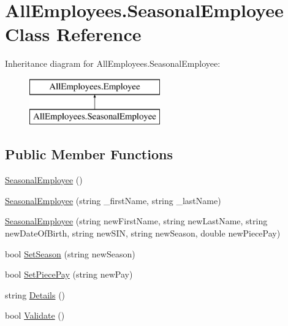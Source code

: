 \hypertarget{class_all_employees_1_1_seasonal_employee}{}\section{All\+Employees.\+Seasonal\+Employee Class Reference}
\label{class_all_employees_1_1_seasonal_employee}
Inheritance diagram for All\+Employees.\+Seasonal\+Employee\+:\begin{figure}[H]
\begin{center}
\leavevmode
\includegraphics[height=2.000000cm]{class_all_employees_1_1_seasonal_employee}
\end{center}
\end{figure}
\subsection*{Public Member Functions}
\begin{DoxyCompactItemize}
\item 
\hyperlink{class_all_employees_1_1_seasonal_employee_a2206a19da96d42cbd56e7fb5d073c7d4}{Seasonal\+Employee} ()
\item 
\hyperlink{class_all_employees_1_1_seasonal_employee_aa0c1a5afb55e8d691eab0936d5d30786}{Seasonal\+Employee} (string \+\_\+first\+Name, string \+\_\+last\+Name)
\item 
\hyperlink{class_all_employees_1_1_seasonal_employee_acbb93664ccc48e2fe8f57487424a2c53}{Seasonal\+Employee} (string new\+First\+Name, string new\+Last\+Name, string new\+Date\+Of\+Birth, string new\+S\+I\+N, string new\+Season, double new\+Piece\+Pay)
\item 
bool \hyperlink{class_all_employees_1_1_seasonal_employee_a969924a30c6f7d9d9fd814c7b4969995}{Set\+Season} (string new\+Season)
\item 
bool \hyperlink{class_all_employees_1_1_seasonal_employee_aba4f39cdd3d6c6f86d1e7c323a090e31}{Set\+Piece\+Pay} (string new\+Pay)
\item 
string \hyperlink{class_all_employees_1_1_seasonal_employee_a0474e4afe0e11f4e2dd0a523bff3034b}{Details} ()
\item 
bool \hyperlink{class_all_employees_1_1_seasonal_employee_a70f911ac43a67b84f93ead74860bb6d9}{Validate} ()
\end{DoxyCompactItemize}
